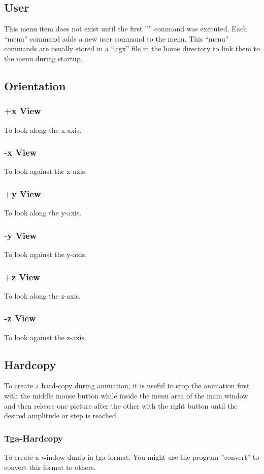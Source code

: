 \documentclass{article}
\begin{document}
\subsection{\label{User}User}
This menu item does not exist until the first '''' command was executed. Each ``menu'' command adds a new user command to the menu. This ``menu'' commands are usually stored in a ``.cgx'' file in the home directory to link them to the menu during startup.

\subsection{\label{Orientation}Orientation}
\subsubsection{+x View}
To look along the x-axis.
\subsubsection{-x View}
To look against the x-axis.
\subsubsection{+y View}
To look along the y-axis.
\subsubsection{-y View}
To look against the y-axis.
\subsubsection{+z View}
To look along the z-axis.
\subsubsection{-z View}
To look against the z-axis.

\subsection{\label{Hardcopy}Hardcopy}
To create a hard-copy during animation, it is useful to stop the animation first with the middle mouse button while inside the menu area of the main window and then release one picture after the other with the right button until the desired amplitude or step is reached.
 
\subsubsection{\label{Tga-Hardcopy}Tga-Hardcopy}
To create a window dump in tga format. You might use the program ''convert'' \cite{ImageMagick} to convert this format to others.
\end{document}
